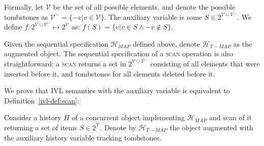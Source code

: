 Formally, let $\mathcal{V}$ be the set of all possible elements, and denote the possible
tombstones as $\mathcal{V}^-=\{-v| v \in \mathcal{V}\}$. The auxiliary variable
is some $S \in 2^{\mathcal{V} \cup \mathcal{V}^-}$. We define $f : 2^{\mathcal{V} \cup \mathcal{V}^-} \mapsto 2^{\mathcal{V}}$  as:
$f(S) = \{v| v \in S \wedge -v \notin S\}$.

Given the sequential specification $\mathcal{H}_{MAP}$ defined above, denote $\mathcal{H}_{T-MAP}$ as
the augmented object. The sequential specification of a \textsc{scan} operation is
also straightforward: a \textsc{scan} returns a set in $2^{\mathcal{V} \cup \mathcal{V}^-}$
consisting of all elements that were
inserted before it, and tombstones for all elements deleted before it.

We prove that IVL semantics with the auxiliary variable is equivalent to Definition~\ref{ivl-def:scan}:
\begin{lemma}   
Consider a history $H$ of a concurrent object implementing $\mathcal{H}_{MAP}$ and  scan of it returning a set
of items $S \in 2^{\mathcal{V}}$. Denote by $\mathcal{H}_{T-MAP}$ the object augmented with
the auxiliary history variable tracking tombstones.
\end{lemma}
